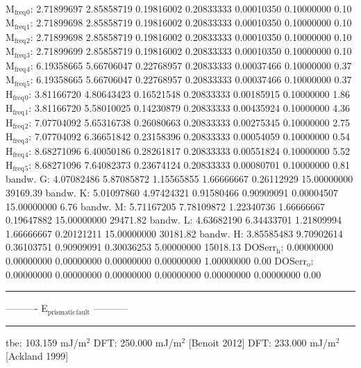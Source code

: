 \documentclass[11pt]{article}
\begin{document}
M\(_{\text{freq}}\)\(_{\text{0}}\):   2.71899697   2.85858719   0.19816002   0.20833333   0.00010350   0.10000000         0.10
M\(_{\text{freq}}\)\(_{\text{1}}\):   2.71899698   2.85858719   0.19816002   0.20833333   0.00010350   0.10000000         0.10
M\(_{\text{freq}}\)\(_{\text{2}}\):   2.71899698   2.85858719   0.19816002   0.20833333   0.00010350   0.10000000         0.10
M\(_{\text{freq}}\)\(_{\text{3}}\):   2.71899699   2.85858719   0.19816002   0.20833333   0.00010350   0.10000000         0.10
M\(_{\text{freq}}\)\(_{\text{4}}\):   6.19358665   5.66706047   0.22768957   0.20833333   0.00037466   0.10000000         0.37
M\(_{\text{freq}}\)\(_{\text{5}}\):   6.19358665   5.66706047   0.22768957   0.20833333   0.00037466   0.10000000         0.37
H\(_{\text{freq}}\)\(_{\text{0}}\):   3.81166720   4.80643423   0.16521548   0.20833333   0.00185915   0.10000000         1.86
H\(_{\text{freq}}\)\(_{\text{1}}\):   3.81166720   5.58010025   0.14230879   0.20833333   0.00435924   0.10000000         4.36
H\(_{\text{freq}}\)\(_{\text{2}}\):   7.07704092   5.65316738   0.26080663   0.20833333   0.00275345   0.10000000         2.75
H\(_{\text{freq}}\)\(_{\text{3}}\):   7.07704092   6.36651842   0.23158396   0.20833333   0.00054059   0.10000000         0.54
H\(_{\text{freq}}\)\(_{\text{4}}\):   8.68271096   6.40050186   0.28261817   0.20833333   0.00551824   0.10000000         5.52
H\(_{\text{freq}}\)\(_{\text{5}}\):   8.68271096   7.64082373   0.23674124   0.20833333   0.00080701   0.10000000         0.81
bandw. G:   4.07082486   5.87085872   1.15565855   1.66666667   0.26112929  15.00000000     39169.39
bandw. K:   5.01097860   4.97424321   0.91580466   0.90909091   0.00004507  15.00000000         6.76
bandw. M:   5.71167205   7.78109872   1.22340736   1.66666667   0.19647882  15.00000000     29471.82
bandw. L:   4.63682190   6.34433701   1.21809994   1.66666667   0.20121211  15.00000000     30181.82
bandw. H:   3.85585483   9.70902614   0.36103751   0.90909091   0.30036253   5.00000000     15018.13
DOSerr\(_{\text{h}}\):   0.00000000   0.00000000   0.00000000   0.00000000   0.00000000   1.00000000         0.00
DOSerr\(_{\text{o}}\):   0.00000000   0.00000000   0.00000000   0.00000000   0.00000000 0.00000000         0.00

\noindent\rule{\textwidth}{0.5pt}
----------     E\(_{\text{prismatic}}\)\(_{\text{fault}}\)     -----------

\noindent\rule{\textwidth}{0.5pt}

tbe:       103.159 mJ/m\(^{\text{2}}\)
DFT:       250.000 mJ/m\(^{\text{2}}\) [Benoit  2012]
DFT:       233.000 mJ/m\(^{\text{2}}\) [Ackland 1999]
\end{document}
